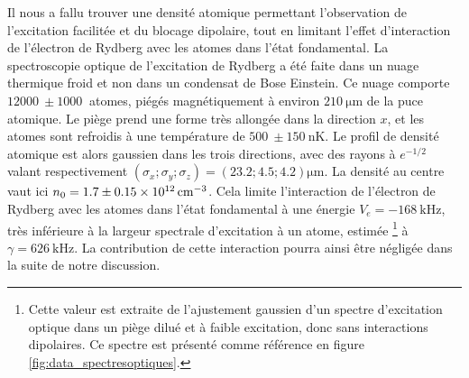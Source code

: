 Il nous a fallu trouver une densité atomique permettant l'observation de l'excitation facilitée et du blocage dipolaire, tout en limitant l'effet d'interaction de l'électron de Rydberg avec les atomes dans l'état fondamental.
La spectroscopie optique de l'excitation de Rydberg a été faite dans un nuage thermique froid et non dans un condensat de Bose Einstein.
Ce nuage comporte $\SI{12000}{} \pm \SI{1000}{}$ atomes, piégés magnétiquement à environ $\SI{210}{\um}$ de la puce atomique.
Le piège prend une forme très allongée dans la direction $x$, et les atomes sont refroidis à une température de $\SI{500}{} \pm \SI{150}{\nano\kelvin}$.
Le profil de densité atomique est alors gaussien dans les trois directions, avec des rayons à $e^{-1/2}$ valant respectivement $(\sigma_x;\sigma_y;\sigma_z) = (\num{23.2} ; \num{4.5} ; \num{4.2})\si{\um}$.
La densité au centre vaut ici $n_0 = \num{1.7}\pm\SI{0.15e12}{\per\raiseto{3}\cm}$.
Cela limite l'interaction de l'électron de Rydberg avec les atomes dans l'état fondamental à une énergie $V_e = -\SI{168}{\kHz}$, très inférieure à la largeur spectrale d'excitation à un atome, estimée \footnote{
Cette valeur est extraite de l'ajustement gaussien d'un spectre d'excitation optique dans un piège dilué et à faible excitation, donc sans interactions dipolaires.
Ce spectre est présenté comme référence en figure \eqref{fig:data_spectresoptiques}.}
à $\gamma = \SI{626}{\kHz}$.
La contribution de cette interaction pourra ainsi être négligée dans la suite de notre discussion.


